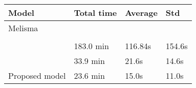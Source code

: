 \begin{tabular}{l|lll}
    Model                        & Total time & Average & Std   \\
    \hline
    Melisma                      &            &         &       \\
    \textcite{chen2021attend}    &            &         &       \\
    \textcite{mcleod2021modular} & 183.0 min  & 116.84s & 154.6s \\
    \textcite{micchi2021deep}    & 33.9 min   & 21.6s   & 14.6s  \\
    Proposed model               & 23.6 min   & 15.0s   & 11.0s  \\
\end{tabular}
